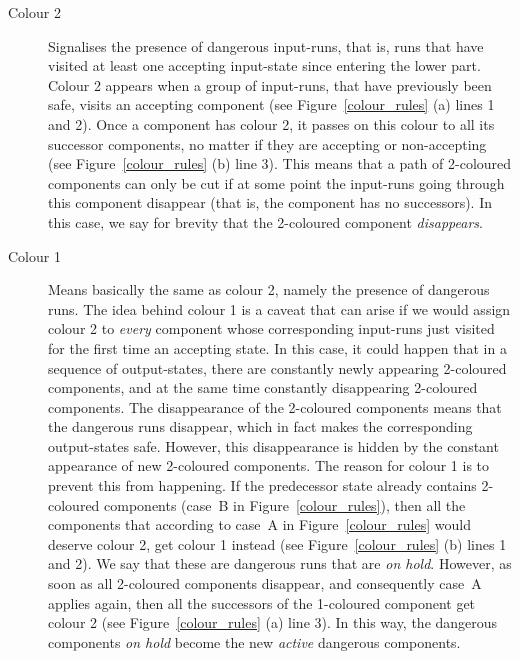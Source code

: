 {
\begin{description}
\item[Colour 2]
Signalises the presence of dangerous input-runs, that is, runs that have visited at least one accepting input-state since entering the lower part. Colour 2 appears when a group of input-runs, that have previously been safe, visits an accepting component (see Figure~\ref{colour_rules} (a) lines 1 and 2). Once a component has colour 2, it passes on this colour to all its successor components, no matter if they are accepting or non-accepting (see Figure~\ref{colour_rules} (b) line 3). This means that a path of 2-coloured components can only be cut if at some point the input-runs going through this component disappear (that is, the component has no successors). In this case, we say for brevity that the 2-coloured component \textit{disappears}.



\item[Colour 1]
Means basically the same as colour 2, namely the presence of dangerous runs. The idea behind colour 1 is a caveat that can arise if we would assign colour 2 to \textit{every} component whose corresponding input-runs just visited for the first time an accepting state. In this case, it could happen that in a sequence of output-states, there are constantly newly appearing 2-coloured components, and at the same time constantly disappearing 2-coloured components. The disappearance of the 2-coloured components means that the dangerous runs disappear, which in fact makes the corresponding output-states safe. However, this disappearance is hidden by the constant appearance of new 2-coloured components. The reason for colour 1 is to prevent this from happening. If the predecessor state already contains 2-coloured components (case~B in Figure~\ref{colour_rules}), then all the components that according to case~A in Figure~\ref{colour_rules} would deserve colour 2, get colour 1 instead (see Figure~\ref{colour_rules} (b) lines 1 and 2). We say that these are dangerous runs that are \textit{on hold}. However, as soon as all 2-coloured components disappear, and consequently case~A applies again, then all the successors of the 1-coloured component get colour 2 (see Figure~\ref{colour_rules} (a) line 3). In this way, the dangerous components \textit{on hold} become the new \textit{active} dangerous components.


\end{description}}
